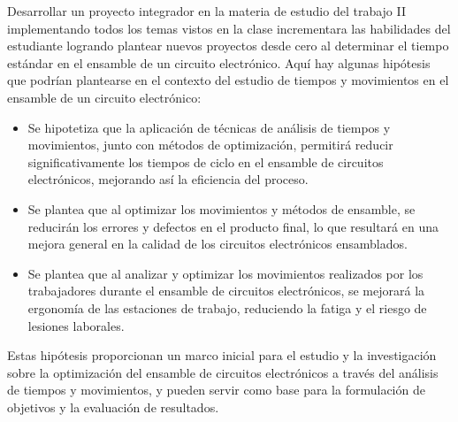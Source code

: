     Desarrollar un proyecto integrador en la materia de estudio del trabajo II implementando todos los temas vistos en la clase incrementara las habilidades del estudiante logrando plantear nuevos proyectos desde cero al determinar el tiempo estándar en el ensamble de un circuito electrónico.
    Aquí hay algunas hipótesis que podrían plantearse en el contexto del estudio de tiempos y movimientos en el ensamble de un circuito electrónico:
        \begin{itemize}
            \item  Se hipotetiza que la aplicación de técnicas de análisis de tiempos y movimientos, junto con métodos de optimización, permitirá reducir significativamente los tiempos de ciclo en el ensamble de circuitos electrónicos, mejorando así la eficiencia del proceso.
            \item Se plantea que al optimizar los movimientos y métodos de ensamble, se reducirán los errores y defectos en el producto final, lo que resultará en una mejora general en la calidad de los circuitos electrónicos ensamblados.
            \item Se plantea que al analizar y optimizar los movimientos realizados por los trabajadores durante el ensamble de circuitos electrónicos, se mejorará la ergonomía de las estaciones de trabajo, reduciendo la fatiga y el riesgo de lesiones laborales.
        \end{itemize}
        Estas hipótesis proporcionan un marco inicial para el estudio y la investigación sobre la optimización del ensamble de circuitos electrónicos a través del análisis de tiempos y movimientos, y pueden servir como base para la formulación de objetivos y la evaluación de resultados.
